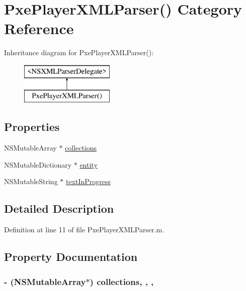\hypertarget{category_pxe_player_x_m_l_parser_07_08}{\section{Pxe\-Player\-X\-M\-L\-Parser() Category Reference}
\label{category_pxe_player_x_m_l_parser_07_08}
}
Inheritance diagram for Pxe\-Player\-X\-M\-L\-Parser()\-:\begin{figure}[H]
\begin{center}
\leavevmode
\includegraphics[height=2.000000cm]{category_pxe_player_x_m_l_parser_07_08}
\end{center}
\end{figure}
\subsection*{Properties}
\begin{DoxyCompactItemize}
\item 
N\-S\-Mutable\-Array $\ast$ \hyperlink{category_pxe_player_x_m_l_parser_07_08_a2ac17699086734e46e39a1bfd8b3f749}{collections}
\item 
N\-S\-Mutable\-Dictionary $\ast$ \hyperlink{category_pxe_player_x_m_l_parser_07_08_abf485c61ffa04ef93bc172c965b45553}{entity}
\item 
N\-S\-Mutable\-String $\ast$ \hyperlink{category_pxe_player_x_m_l_parser_07_08_a8b6c70906722a1b5a4cb50d148ef22d2}{text\-In\-Progress}
\end{DoxyCompactItemize}


\subsection{Detailed Description}


Definition at line 11 of file Pxe\-Player\-X\-M\-L\-Parser.\-m.



\subsection{Property Documentation}
\hypertarget{category_pxe_player_x_m_l_parser_07_08_a2ac17699086734e46e39a1bfd8b3f749}{
\subsubsection[{collections}]{\setlength{\rightskip}{0pt plus 5cm}-\/ (N\-S\-Mutable\-Array$\ast$) collections\hspace{0.3cm}{\ttfamily [read]}, {\ttfamily [write]}, {\ttfamily [nonatomic]}, {\ttfamily [strong]}}}\label{category_pxe_player_x_m_l_parser_07_08_a2ac17699086734e46e39a1bfd8b3f749}


